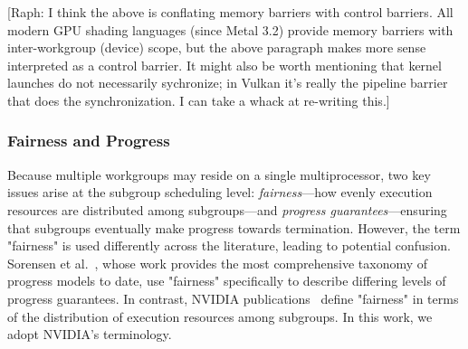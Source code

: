 \documentclass[sigconf]{acmart}
\newcommand{\raph}[1]{{\footnotesize\color{magenta}[Raph: #1]}}
\begin{document}
\raph{I think the above is conflating memory barriers with control barriers. All modern GPU shading languages (since Metal 3.2) provide memory barriers with inter-workgroup (device) scope, but the above paragraph makes more sense interpreted as a control barrier. It might also be worth mentioning that kernel launches do not necessarily sychronize; in Vulkan it's really the pipeline barrier that does the synchronization. I can take a whack at re-writing this.}

\subsubsection{Fairness and Progress}
Because multiple workgroups may reside on a single multiprocessor, two key issues arise at the subgroup scheduling level: \emph{fairness}---how evenly execution resources are distributed among subgroups---and \emph{progress guarantees}---ensuring that subgroups eventually make progress towards termination. However, the term "fairness" is used differently across the literature, leading to potential confusion. Sorensen et al.~\cite{sorensen2016,sorensen2018,sorensen2021}, whose work provides the most comprehensive taxonomy of progress models to date, use "fairness" specifically to describe differing levels of progress guarantees. In contrast, NVIDIA publications~\cite{4523358,Merrill2016} define "fairness" in terms of the distribution of execution resources among subgroups. In this work, we adopt NVIDIA's terminology.
\end{document}
